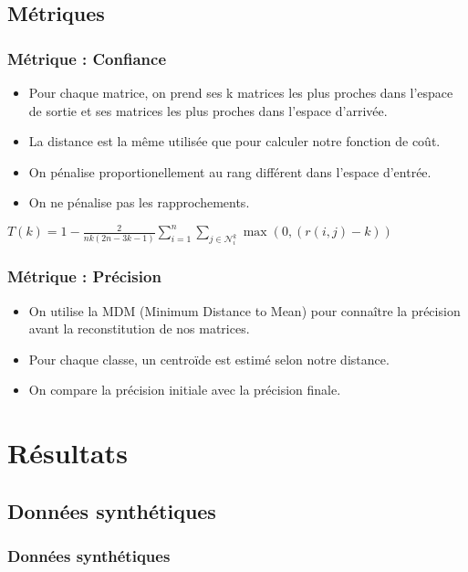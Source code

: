 \documentclass{beamer}
\begin{document}
\subsection{Métriques}
\begin{frame}
\frametitle{Métrique : Confiance}
\begin{itemize}
    \item Pour chaque matrice, on prend ses k matrices les plus proches dans l'espace de sortie et ses matrices les plus proches dans l'espace d'arrivée.
    \item La distance est la même utilisée que pour calculer notre fonction de coût.
    \item On pénalise proportionellement au rang différent dans l'espace d'entrée.
    \item On ne pénalise pas les rapprochements.
\end{itemize}

\begin{center}
    $ T(k) = 1 - \frac{2}{nk(2n-3k-1)} \sum\limits_{i=1}^n\sum\limits_{j\in\mathcal{N}_i^k} \max(0,(r(i,j)-k)) $
\end{center}

\end{frame}
\begin{frame}
\frametitle{Métrique : Précision}
\begin{itemize}
    \item On utilise la MDM (Minimum Distance to Mean) pour connaître la précision avant la reconstitution de nos matrices.
    \item Pour chaque classe, un centroïde est estimé selon notre distance.
    \item On compare la précision initiale avec la précision finale.
\end{itemize}

\end{frame}


\section{Résultats}

\subsection{Données synthétiques}
\begin{frame}
\frametitle{Données synthétiques}

\end{frame}
\end{document}
